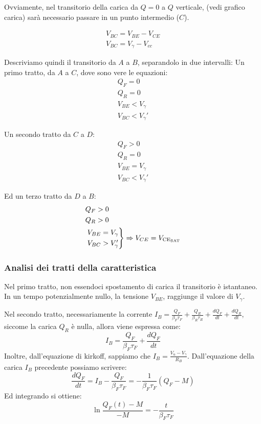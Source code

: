 \documentclass[../template]{subfiles}
\begin{document}
Ovviamente, nel transitorio della carica da $Q =0$ a $Q$ verticale, (vedi grafico carica) sarà necessario passare in un punto intermedio ($C$).
\begin{tcolorbox}
    \begin{align*}
        V_{BC} = V_{BE} - V_{CE}
        \\
        V_{BC} = V_\gamma - V_{cc}
    \end{align*}

\end{tcolorbox}
Descriviamo quindi il transitorio da $A$ a $B$, separandolo in due intervalli:
Un primo tratto, da $A$ a $C$, dove sono vere le equazioni:
\begin{align*}
    Q_F = 0 \\
    Q_R = 0 \\
    V_{BE} < V_\gamma \\
    V_{BC} < V_\gamma'
\end{align*}

Un secondo tratto da $C$ a $D$:
\begin{align*}
    Q_F > 0 \\
    Q_R = 0 \\
    V_{BE} = V_\gamma \\
    V_{BC} < V_\gamma'
\end{align*}

Ed un terzo tratto da $D$ a $B$:
\begin{align*}
    &Q_F > 0 \\
    &Q_R > 0 \\
    &\begin{rcases}
        V_{BE} = V_\gamma \\
        V_{BC} > V_\gamma '
    \end{rcases} \Rightarrow V_{CE} = V_{\text{CE}_{\text{SAT}}}
\end{align*}

\subsubsection{Analisi dei tratti della caratteristica}
Nel primo tratto, non essendoci spostamento di carica il transitorio è istantaneo.  In un tempo potenzialmente nullo, la tensione $V_{BE}$, raggiunge il valore di $V_\gamma$.

Nel secondo tratto, necessariamente la corrente $I_B = \frac{Q_F}{\beta_F \tau_F} + \frac{Q_R}{\beta_R \tau_R} + \frac{dQ_F}{dt} + \frac{dQ_R}{dt}$, siccome la carica $Q_R$ è nulla, allora viene espressa come:
\[
    I_B = \frac{Q_F}{\beta_F \tau_F} + \frac{dQ_F}{dt}
\]
Inoltre, dall'equazione di kirkoff, sappiamo che $I_B = \frac{V_u - V_\gamma}{R_B}$.
Dall'equazione della carica $I_B$ precedente possiamo scrivere:
\[
    \frac{dQ_F}{dt} = I_B - \frac{Q_F}{\beta_F \tau_F} =  - \frac{1}{\beta_F \tau_F} (Q_F - M)
\]
Ed integrando si ottiene:
\[
    \ln \frac{Q_F(t) - M}{- M} = - \frac{t} {\beta_F \tau_F}
\]
\end{document}
